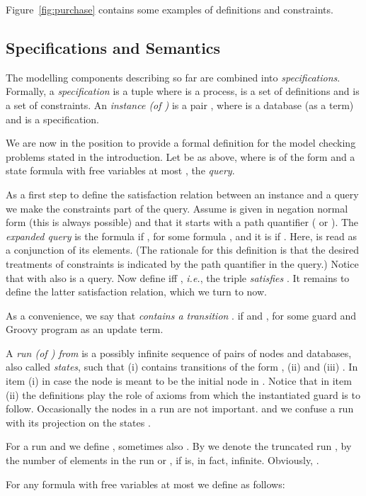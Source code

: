 \documentclass{llncs}
\newcommand{\ie}{\textit{i.e.}}
\begin{document}
{Figure~\ref{fig:purchase} contains some examples of definitions and constraints.


\subsection{Specifications and Semantics}
The modelling components describing so far are combined into \emph{specifications}.
Formally, a \emph{specification}  is a tuple  where  is a process,  is a set of definitions and
 is a set of constraints.
An \emph{instance  (of )} is a pair , where 
is a database (as a term) and  is a specification.

We are now in the position to provide a formal definition for the model checking
problems stated in the introduction.
Let  be as above, where 
is of the form  and  a state formula with free variables
at most , the \emph{query}.

As a first step to define the satisfaction relation  between an
instance and a query we make
the constraints  part of the query. Assume  is given in negation
normal form (this is always possible) and that it starts with a path quantifier
( or ). The \emph{expanded query } is the formula
 if , for some formula , and it is
 if .
Here,  is read as a conjunction of its elements. (The rationale for this definition is that the
desired treatments of constraints is indicated by the path quantifier in the query.)
Notice that with  also  is a query.
Now define  iff , \ie,
the triple  \emph{satisfies} .
It remains to define the latter satisfaction relation, which we turn to now.

As a convenience, we say that \emph{ contains a transition }.  if  and , for some
guard  and Groovy program  as an update term.

A \emph{run  (of ) from } is a possibly
infinite sequence  of pairs of nodes and
databases, also called \emph{states}, such that (i)
 contains transitions of the form  , (ii)  and (iii) . In item (i)
in case  the node  is meant to be the initial node  in .
Notice that in item (ii) the definitions  play the role of axioms from which
the instantiated guard  is to follow.
Occasionally the nodes in a run are not important. and we confuse a run with its
projection on the states  .

For a run   and  we define ,
sometimes also .
By  we denote the truncated run , by  the number of elements in the run or ,
if  is, in fact, infinite.  Obviously, .


For any formula  with free variables at most  we define
 as follows:

}
\end{document}
